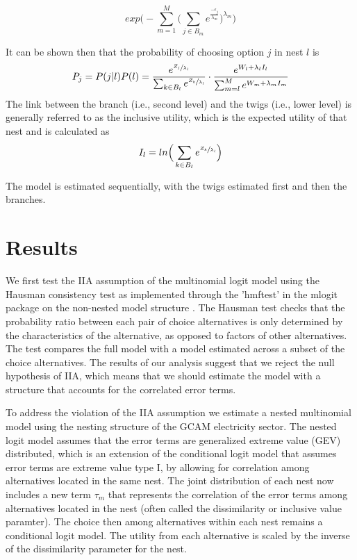 \documentclass[10pt]{amsart}
\begin{document}
\begin{equation}\label{nestederror}
exp\Big(- \sum_{m=1}^{M} \Big(\sum_{j\in B_m} e^{\frac{-\epsilon_j}{\lambda_m}} \Big)^{\lambda_m} \Big)
\end{equation} 

It can be shown then that the probability of choosing option $j$ in nest $l$ is 
\begin{equation}\label{nestedstructure}
P_j = P(j | l)P(l) = \frac{e^{\sfrac{{Z_j}}{\lambda_l}}}{\sum_{k\in B_l}e^{\sfrac{Z_k}{\lambda_l}}} \cdot \frac{e^{W_l+\lambda_l I_l}}{\sum_{m=l}^M e^{W_m+\lambda_m I_m}}
\end{equation}
The link between the branch (i.e., second level) and the twigs (i.e., lower level) is generally referred to as the inclusive utility, which is the expected utility of that nest and is calculated as 
\begin{equation}
I_l = ln\Big(\sum_{k\in B_l} e^{\sfrac{Z_k}{\lambda_l}}\Big)\end{equation}

The model is estimated sequentially, with the twigs estimated first and then the branches.  

\section{Results}
We first test the IIA assumption of the multinomial logit model using the Hausman consistency test as implemented through the 'hmftest' in the mlogit package on the non-nested model structure \parencite{mlogit2013}. 
The Hausman test checks that the probability ratio between each pair of choice alternatives is only determined by the characteristics of the alternative, as opposed to factors of other alternatives. 
The test compares the full model with a model estimated across a subset of the choice alternatives.
The results of our analysis suggest that we reject the null hypothesis of IIA, which means that we should estimate the model with a structure that accounts for the correlated error terms.  
  
To address the violation of the IIA assumption we estimate a nested multinomial model using the nesting structure of the GCAM electricity sector.
The nested logit model assumes that the error terms are generalized extreme value (GEV) distributed, which is an extension of the conditional logit model that assumes error terms are extreme value type I, by allowing for correlation among alternatives located in the same nest. 
The joint distribution of each nest now includes a new term $\tau_m$ that represents the correlation of the error terms among alternatives located in the nest (often called the dissimilarity or inclusive value paramter). 
The choice then among alternatives within each nest remains a conditional logit model.
The utility from each alternative is scaled by the inverse of the dissimilarity parameter for the nest. 
\end{document}
